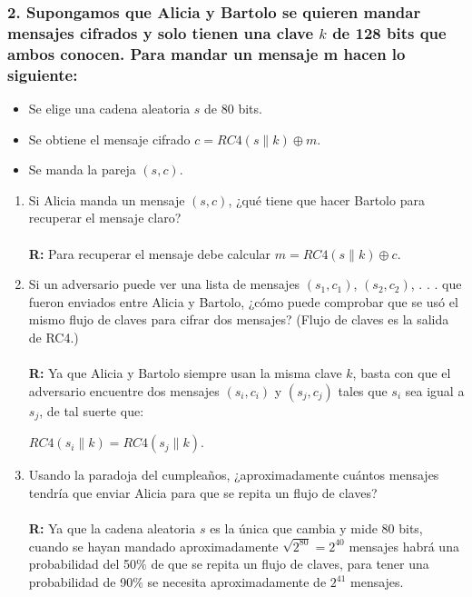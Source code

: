 \documentclass[12pt]{article}
\begin{document}
\subsubsection*{2. Supongamos que Alicia y Bartolo se quieren mandar mensajes cifrados y solo tienen una clave $k$ de 128 bits que ambos conocen. Para mandar un mensaje m hacen lo siguiente:}
\begin{itemize}
\item Se elige una cadena aleatoria $s$ de 80 bits.
\item Se obtiene el mensaje cifrado $c = RC4(s \parallel k) \oplus m$.
\item Se manda la pareja $(s, c)$.
\end{itemize}
\begin{enumerate}[label=\alph*)]
\item Si Alicia manda un mensaje $(s, c)$, ¿qué tiene que hacer Bartolo para recuperar el mensaje claro? \\ \\
\textbf{R:} Para recuperar el mensaje debe calcular $m = RC4(s \parallel k) \oplus c$.
  
\item Si un adversario puede ver una lista de mensajes $(s_1, c_1)$, $(s_2, c_2)$, . . . que fueron enviados entre Alicia y Bartolo, ¿cómo puede comprobar que se usó el mismo flujo de claves para cifrar dos mensajes? (Flujo de claves es la salida de RC4.) \\ \\
  \textbf{R:} Ya que Alicia y Bartolo siempre usan la misma clave $k$, basta con que el adversario encuentre dos mensajes $(s_i, c_i)$ y $(s_j, c_j)$ tales que $s_i$ sea igual a $s_j$, de tal suerte que:
  \begin{center} $RC4(s_i \parallel k) = RC4(s_j \parallel k)$.\end{center}
  
\item Usando la paradoja del cumpleaños, ¿aproximadamente cuántos mensajes tendría que enviar Alicia para que se repita un flujo de claves? \\ \\
 \textbf{R:} Ya que la cadena aleatoria $s$ es la única que cambia y mide 80 bits, cuando se hayan mandado aproximadamente $\sqrt{2^{80}} = 2^{40}$ mensajes habrá una probabilidad del 50$\%$ de que se repita un flujo de claves, para tener una probabilidad de 90$\%$ se necesita aproximadamente de $2^{41}$ mensajes.

\end{enumerate}
\end{document}
